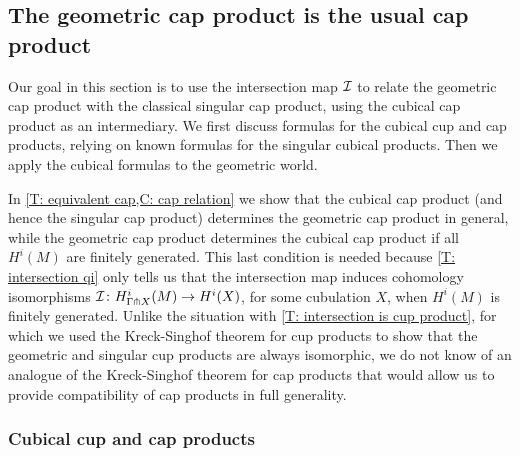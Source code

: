 \begin{comment}
	\begin{theorem}
		Let $M$ and $N$ be manifolds.
		Then the geometric cohomology cross product $H^i_\Gamma(M) \otimes H^j_\Gamma(N) \to H^{i+j}_\Gamma(M \times N)$ is isomorphic to the singular cohomology cross product $H^i(M) \otimes H^j(N) \to H^{i+j}(M \times N)$.
	\end{theorem}

	\begin{proof}
		NEED MORE GENERAL INTERSECTION MAP THEOREM OR TO RESTRICT TO COMPACT MANIFOLDS

	\end{proof}
\end{comment}

\subsection{The geometric cap product is the usual cap product}

Our goal in this section is to use the intersection map $\mathcal{I}$ to relate the geometric cap product with the classical singular cap product, using the cubical cap product as an intermediary.
We first discuss formulas for the cubical cup and cap products, relying on known formulas for the singular cubical products.
Then we apply the cubical formulas to the geometric world.

In \cref{T: equivalent cap,C: cap relation} we show that the cubical cap product (and hence the singular cap product) determines the geometric cap product in general, while the geometric cap product determines the cubical cap product if all $H^i(M)$ are finitely generated.
This last condition is needed because \cref{T: intersection qi} only tells us that the intersection map induces cohomology isomorphisms $\mathcal{I} \colon H^i_{\Gamma \pitchfork X}(M) \to H^i(X)$, for some cubulation $X$, when $H^i(M)$ is finitely generated.
Unlike the situation with \cref{T: intersection is cup product}, for which we used the Kreck-Singhof theorem for cup products to show that the geometric and singular cup products are always isomorphic, we do not know of an analogue of the Kreck-Singhof theorem for cap products that would allow us to provide compatibility of cap products in full generality.

\subsubsection{Cubical cup and cap products}\label{S: cubical products}

